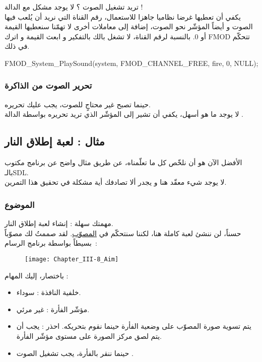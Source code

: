 تريد تشغيل الصوت ؟ لا يوجد مشكل مع الدالة
 !\\
يكفي أن تعطيها غرضا نظاميا جاهزا للاستعمال، رقم القناة التي نريد أن يُلعب فيها الصوت و أيضاً المؤشّر نحو الصوت، إضافة إلى معاملات أخرى لا تهمّنا سنعطيها القيمة
أو 0. بالنسبة لرقم القناة، لا تشغل بالك بالتفكير و ابعث القيمة
و اترك
\textenglish{FMOD}
تتحكّم في ذلك.

\begin{Csource}
FMOD_System_PlaySound(system, FMOD_CHANNEL_FREE, fire, 0, NULL);
\end{Csource}

\subsubsection{تحرير الصوت من الذاكرة}

حينما تصبح غير محتاجٍ للصوت، يجب عليك تحريره. \\
لا يوجد ما هو أسهل، يكفي أن تشير إلى المؤشّر الذي تريد تحريره بواسطة الدالة
.


\subsection{مثال : لعبة إطلاق النار}

الأفضل الآن هو أن نلخّص كل ما تعلّمناه، عن طريق مثال واضح عن برنامج مكتوب بالـ\textenglish{SDL}.\\
لا يوجد شيء معقّد هنا و يجدر ألا تصادفك أية مشكلة في تحقيق هذا التمرين.

\subsubsection{الموضوع}

مهمتك سهلة : إنشاء لعبة إطلاق النار.\\
حسناً، لن ننشئ لعبة كاملة هنا، لكننا سنتحكّم في
\underline{المصوّب}.
 لقد صممتُ لك مصوّباً بسيطاً بواسطة برنامج الرسام~:

\begin{figure}[H]
	\centering
	\texttt{[image: Chapter\_III-8\_Aim]}
\end{figure}

باختصار، إليك المهام :

\begin{itemize}
	\item خلفية النافذة : سوداء.
	\item مؤشّر الفأرة : غير مرئي.
	\item يتم تسوية صورة المصوّب على وضعية الفأرة حينما نقوم بتحريكه. احذر : يجب أن يتم لصق مركز الصورة على مستوى مؤشّر الفأرة.
	\item حينما ننقر بالفأرة، يجب تشغيل الصوت
	.
\end{itemize}

